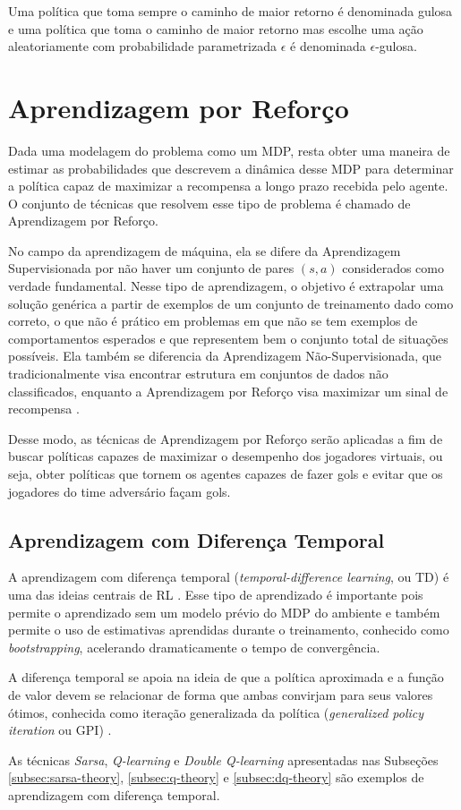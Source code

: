 Uma política que toma sempre o caminho de maior retorno é denominada gulosa e uma política que toma o caminho de maior retorno mas escolhe uma ação aleatoriamente com probabilidade parametrizada $\epsilon$ é denominada $\epsilon$-gulosa.


\section{Aprendizagem por Reforço}

Dada uma modelagem do problema como um MDP, resta obter uma maneira de estimar as probabilidades que descrevem a dinâmica desse MDP para determinar a política capaz de maximizar a recompensa a longo prazo recebida pelo agente. O conjunto de técnicas que resolvem esse tipo de problema é chamado de Aprendizagem por Reforço.

No campo da aprendizagem de máquina, ela se difere da Aprendizagem Supervisionada por não haver um conjunto de pares $(s, a)$ considerados como verdade fundamental.
Nesse tipo de aprendizagem, o objetivo é extrapolar uma solução genérica a partir de exemplos de um conjunto de treinamento dado como correto, o que não é prático em problemas em que não se tem exemplos de comportamentos esperados e que representem bem o conjunto total de situações possíveis.
Ela também se diferencia da Aprendizagem Não-Supervisionada, que tradicionalmente visa encontrar estrutura em conjuntos de dados não classificados, enquanto a Aprendizagem por Reforço visa maximizar um sinal de recompensa \cite{sutton2018reinforcement}.

Desse modo, as técnicas de Aprendizagem por Reforço serão aplicadas a fim de buscar políticas capazes de maximizar o desempenho dos jogadores virtuais, ou seja, obter políticas que tornem os agentes capazes de fazer gols e evitar que os jogadores do time adversário façam gols.

\subsection{Aprendizagem com Diferença Temporal}
\par A aprendizagem com diferença temporal (\textit{temporal-difference learning}, ou TD) é uma das ideias centrais de RL \cite{sutton2018reinforcement}. Esse tipo de aprendizado é importante pois permite o aprendizado sem um modelo prévio do MDP do ambiente e também permite o uso de estimativas aprendidas durante o treinamento, conhecido como \textit{bootstrapping}, acelerando dramaticamente o tempo de convergência. 
\par A diferença temporal se apoia na ideia de que a política aproximada e a função de valor devem se relacionar de forma que ambas convirjam para seus valores ótimos, conhecida como iteração generalizada da política (\textit{generalized policy iteration} ou GPI) \cite{sutton2018reinforcement}. 
\par As técnicas \textit{Sarsa}, \textit{Q-learning} e \textit{Double Q-learning} apresentadas nas Subseções \ref{subsec:sarsa-theory}, \ref{subsec:q-theory} e \ref{subsec:dq-theory} são exemplos de aprendizagem com diferença temporal.

